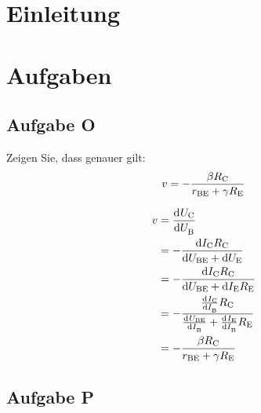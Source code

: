\tableofcontents

\listoftodo
\newpage


\FloatBarrier
\section{Einleitung}



\FloatBarrier
\section{Aufgaben}

\FloatBarrier
\subsection{Aufgabe O}

\begin{problem}
	Zeigen Sie, dass genauer gilt:
	\begin{equation}
		\label{eq:3_4-14}
		v = - \frac{\beta R_\text{C}}{r_\text{BE} + \gamma R_\text{E}}
	\end{equation}
\end{problem}

\begin{align*}
	v &= \dod \UC\UB\\
	  &= -\frac{\dif\IC\RC}{\dif\UBE + \dif\UE}\\
	  &= -\frac{\dif\IC\RC}{\dif\UBE + \dif\IE\RE}\\
	  &= -\frac{\od\IC\IB\RC}{\od\UBE\IB+\od\IE\IB\RE}\\
	  &= -\frac{\beta\RC}{r_\text{BE}+\gamma\RE}
\end{align*}

\FloatBarrier
\subsection{Aufgabe P}

